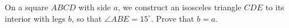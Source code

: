 On a square $ABCD$ with side $a$, we construct an isosceles triangle $CDE$ to its interior with legs $b$, so that $\angle ABE = 15^\circ$. Prove that $b = a$.
